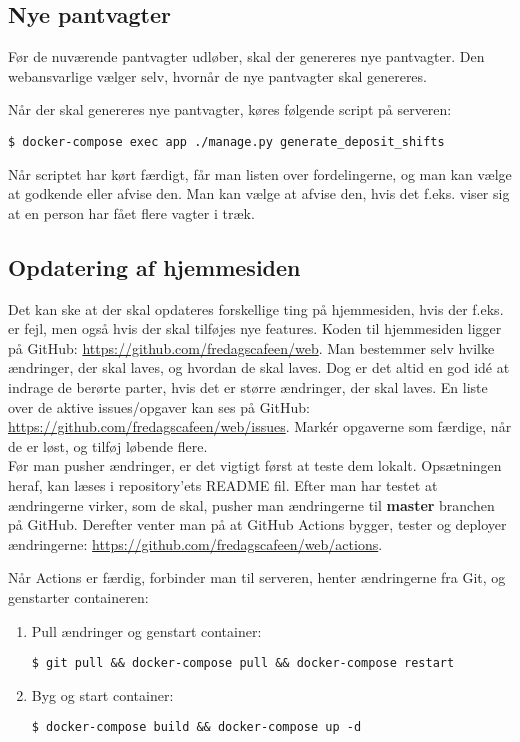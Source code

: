 \subsection{Nye pantvagter}
\label{sec:nye-pantvagter}

Før de nuværende pantvagter udløber, skal der genereres nye pantvagter.
Den webansvarlige vælger selv, hvornår de nye pantvagter skal genereres.

Når der skal genereres nye pantvagter, køres følgende script på serveren:

\begin{verbatim}
$ docker-compose exec app ./manage.py generate_deposit_shifts
\end{verbatim}

Når scriptet har kørt færdigt, får man listen over fordelingerne, og man kan vælge at godkende eller
afvise den. Man kan vælge at afvise den, hvis det f.eks. viser sig at en person har fået flere vagter 
i træk.

\subsection{Opdatering af hjemmesiden}
\label{sec:opdatering-af-hjemmesiden}

Det kan ske at der skal opdateres forskellige ting på hjemmesiden, hvis der f.eks. er fejl, men også
hvis der skal tilføjes nye features.
Koden til hjemmesiden ligger på GitHub: \url{https://github.com/fredagscafeen/web}.
Man bestemmer selv hvilke ændringer, der skal laves, og hvordan de skal laves. Dog er det altid en god
idé at indrage de berørte parter, hvis det er større ændringer, der skal laves. En liste over de
aktive issues/opgaver kan ses på GitHub: \url{https://github.com/fredagscafeen/web/issues}. Markér
opgaverne som færdige, når de er løst, og tilføj løbende flere.\\

Før man pusher ændringer, er det vigtigt først at teste dem lokalt. Opsætningen heraf, 
kan læses i repository'ets README fil.
Efter man har testet at ændringerne virker, som de skal, pusher man ændringerne til \textbf{master}
branchen på GitHub. Derefter venter man på at GitHub Actions bygger, tester og deployer ændringerne:
\url{https://github.com/fredagscafeen/web/actions}.

Når Actions er færdig, forbinder man til serveren, henter ændringerne fra Git, og genstarter containeren:

\begin{enumerate}
    \item Pull ændringer og genstart container:
    \begin{verbatim}
$ git pull && docker-compose pull && docker-compose restart\end{verbatim}
    \item Byg og start container:
    \begin{verbatim}
$ docker-compose build && docker-compose up -d\end{verbatim}
\end{enumerate}

